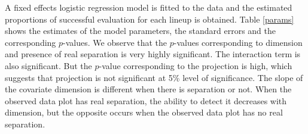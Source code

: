 

A fixed effects logistic regression model is fitted to the data and the estimated proportions of successful evaluation for each lineup is obtained. Table \ref{params} shows the estimates of the model parameters, the standard errors and the corresponding $p$-values. We observe that the $p$-values corresponding to dimension and presence of real separation is very highly significant. The interaction term is also significant. But the $p$-value corresponding to the projection is high, which suggests that projection is not significant at 5\% level of significance. The slope of the covariate dimension is different when there is separation or not. When the observed data plot has real separation, the ability to detect it decreases with dimension, but the opposite occurs when the observed data plot has no real separation.


